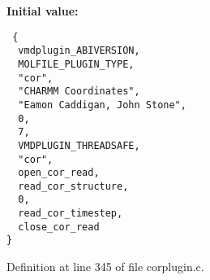 {\bf Initial value:}

\footnotesize\begin{verbatim} {
  vmdplugin_ABIVERSION,         
  MOLFILE_PLUGIN_TYPE,          
  "cor",                        
  "CHARMM Coordinates",         
  "Eamon Caddigan, John Stone", 
  0,                            
  7,                            
  VMDPLUGIN_THREADSAFE,         
  "cor",                        
  open_cor_read,                
  read_cor_structure,           
  0,                            
  read_cor_timestep,            
  close_cor_read                
}\end{verbatim}\normalsize 


Definition at line 345 of file corplugin.c.
